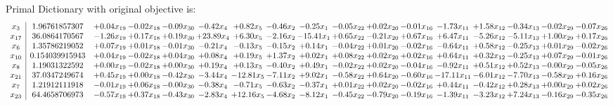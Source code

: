 \documentclass[9pt]{article}
\begin{document}
Primal Dictionary with original objective is:
\[\begin{array}{c| c c@{\hskip 2pt} c@{\hskip 2pt} c@{\hskip 2pt} c@{\hskip 2pt} c@{\hskip 2pt} c@{\hskip 2pt} c@{\hskip 2pt} c@{\hskip 2pt} c@{\hskip 2pt} c@{\hskip 2pt} c@{\hskip 2pt} c@{\hskip 2pt} c@{\hskip 2pt} c@{\hskip 2pt} c@{\hskip 2pt} }
 x_{3}   &  1.96761857307 & +  0.04 x_{19} & -0.02 x_{18} & -0.09 x_{30} & -0.42 x_{4} & +  0.82 x_{5} & -0.46 x_{2} & -0.25 x_{1} & -0.05 x_{22} & +  0.02 x_{20} & -0.01 x_{16} & -1.73 x_{11} & +  1.58 x_{12} & -0.34 x_{13} & -0.02 x_{29} & -0.07 x_{26}\\
 x_{17}   &  36.0864170567 & -1.26 x_{19} & +  0.17 x_{18} & +  0.19 x_{30} & + 23.89 x_{4} & +  6.30 x_{5} & -2.16 x_{2} & -15.41 x_{1} & +  0.65 x_{22} & -0.21 x_{20} & +  0.67 x_{16} & +  6.47 x_{11} & -5.26 x_{12} & -5.11 x_{13} & +  1.00 x_{29} & +  0.17 x_{26}\\
 x_{6}   &  1.35786219052 & +  0.07 x_{19} & +  0.01 x_{18} & -0.01 x_{30} & -0.21 x_{4} & -0.13 x_{5} & -0.15 x_{2} & +  0.14 x_{1} & -0.04 x_{22} & +  0.01 x_{20} & -0.02 x_{16} & -0.64 x_{11} & +  0.58 x_{12} & -0.25 x_{13} & +  0.01 x_{29} & -0.02 x_{26}\\
 x_{10}   &  0.154039915943 & +  0.04 x_{19} & -0.02 x_{18} & +  0.04 x_{30} & +  0.08 x_{4} & +  0.19 x_{5} & +  1.37 x_{2} & +  0.02 x_{1} & +  0.08 x_{22} & +  0.02 x_{20} & +  0.02 x_{16} & +  0.64 x_{11} & +  0.32 x_{12} & -0.25 x_{13} & +  0.07 x_{29} & -0.01 x_{26}\\
 x_{8}   &  1.19031322592 & +  0.00 x_{19} & -0.02 x_{18} & +  0.00 x_{30} & +  0.19 x_{4} & +  0.13 x_{5} & -0.40 x_{2} & +  0.49 x_{1} & -0.02 x_{22} & +  0.02 x_{20} & -0.04 x_{16} & -0.92 x_{11} & +  0.51 x_{12} & +  0.52 x_{13} & -0.00 x_{29} & -0.05 x_{26}\\
 x_{21}   &  37.0347249674 & +  0.45 x_{19} & +  0.00 x_{18} & -0.42 x_{30} & -3.44 x_{4} & -12.81 x_{5} & -7.11 x_{2} & +  9.02 x_{1} & -0.58 x_{22} & +  0.64 x_{20} & -0.60 x_{16} & -17.11 x_{11} & -6.01 x_{12} & -7.70 x_{13} & -0.58 x_{29} & +  0.16 x_{26}\\
 x_{7}   &  1.21912111918 & -0.01 x_{19} & +  0.06 x_{18} & -0.00 x_{30} & -0.38 x_{4} & -0.71 x_{5} & -0.63 x_{2} & -0.37 x_{1} & +  0.01 x_{22} & +  0.02 x_{20} & -0.02 x_{16} & +  0.44 x_{11} & -0.42 x_{12} & +  0.28 x_{13} & +  0.00 x_{29} & +  0.02 x_{26}\\
 x_{23}   &  64.4658706973 & -0.57 x_{19} & +  0.37 x_{18} & -0.43 x_{30} & -2.83 x_{4} & + 12.16 x_{5} & -4.68 x_{2} & -8.12 x_{1} & -0.45 x_{22} & -0.79 x_{20} & -0.19 x_{16} & -1.39 x_{11} & -3.23 x_{12} & +  7.24 x_{13} & -0.16 x_{29} & -0.35 x_{26}\\

\end{array}\]
\end{document}
